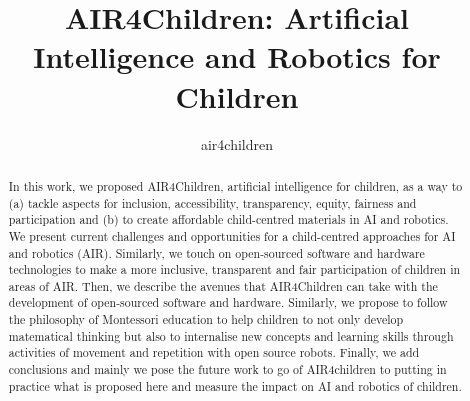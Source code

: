 \documentclass[sigconf]{acmart}
\begin{document}
\title{AIR4Children: Artificial Intelligence and Robotics for Children}


\author{air4children}


\renewcommand{\shortauthors}{air4children}

\begin{abstract}
In this work, we proposed AIR4Children, artificial intelligence for children, as a way to (a) tackle aspects for inclusion, accessibility, transparency, equity, fairness and participation and (b) to create affordable child-centred materials in AI and robotics.
We present current challenges and opportunities for a child-centred approaches for AI and robotics (AIR). 
Similarly, we touch on open-sourced software and hardware technologies to make a more inclusive, transparent and fair participation of children in areas of AIR. 
Then, we describe the avenues that AIR4Children can take with the development of open-sourced software and hardware.
Similarly, we propose to follow the philosophy of Montessori education 
to help children to not only develop matematical thinking but also to internalise new concepts and learning skills through activities of movement and repetition with open source robots.
Finally, we add conclusions and mainly we pose the future work to go of AIR4children to putting in practice what is proposed here and measure the impact on AI and robotics of children. 
\end{abstract}
\end{document}
